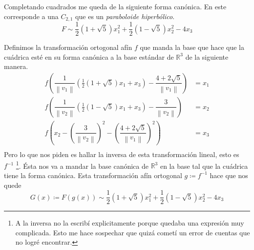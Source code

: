 \documentclass{article}
\newcommand{\norm}[1]{\left\lVert#1\right\rVert}
\begin{document}
 Completando cuadrados me queda de la siguiente forma canónica. En este corresponde a una $C_{2,1}$ que es un \textit{paraboloide hiperbólico}.
 \[ F \sim \frac{1}{2} (1+\sqrt{5})x_1 ^2 +  \frac{1}{2} (1-\sqrt{5}) x_2 ^2 - 4x_3 \]
 
 Definimos la transformación ortogonal afín $f$ que manda la base que hace que la cuádrica esté en su forma canónica a la base estándar de $\mathbb R ^3$
 de la siguiente manera.
  \begin{align*}
   f\left( \dfrac{1}{\norm{v_1}}(\frac{1}{2}(1+\sqrt{5})x_1 + x_3) - \dfrac{4+2\sqrt{5}}{\norm{v_1}} \right) &= x_1  \\
   f\left( \dfrac{1}{\norm{v_2}}(\frac{1}{2}(1-\sqrt{5})x_1 + x_3) - \dfrac{3}{\norm{v_2}} \right) &= x_2  \\
   f\left( x_2 -\left( \dfrac{3}{\norm{v_2}}\right)  ^2 - \left( \dfrac{4+2\sqrt{5}}{\norm{v_1}}\right) ^2 \right)  &= x_3  \\
 \end{align*}
Pero lo que nos piden es hallar la inversa de esta transformación lineal, esto es $f^{-1}$ \footnote{A la inversa no la escribí explicitamente porque quedaba una expresión muy complicada.  Esto me hace sospechar que quizá cometí un error de cuentas que no logré encontrar.}. Ésta nos va a mandar la base canónica de $\mathbb R ^3$ en la base tal que la cuádrica tiene la forma canónica. Esta transformación afín ortogonal $g  \coloneqq f^{-1}$ hace que nos quede 
\[ G(x) \coloneqq F(g(x)) \sim \frac{1}{2} (1+\sqrt{5})x_1 ^2 +  \frac{1}{2} (1-\sqrt{5}) x_2 ^2 - 4x_3 \]
\end{document}
